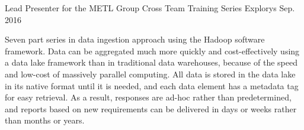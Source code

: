 \begin{cventries}
  \cventry
    {Lead Presenter for the METL Group} %
    {Cross Team Training Series} %
    {Explorys} %
    {Sep. 2016} %
    {
      \begin{cvitems} %
        \item {Seven part series in data ingestion approach using the Hadoop software framework.  Data can be aggregated much more quickly and cost-effectively using a data lake framework than in traditional data warehouses, because of the speed and low-cost of massively parallel computing.  All data is stored in the data lake in its native format until it is needed, and each data element has a metadata tag for easy retrieval.  As a result, responses are ad-hoc rather than predetermined, and reports based on new requirements can be delivered in days or weeks rather than months or years.}
      \end{cvitems}
    }

\end{cventries}
